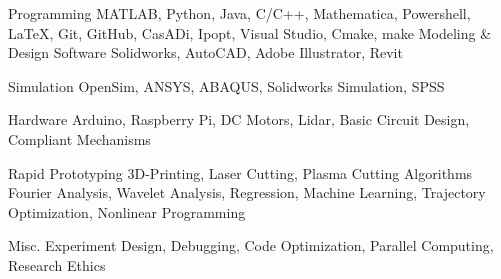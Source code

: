 

\begin{cvskills}

  \cvskill
    {Programming} %
    {MATLAB, Python, Java, C/C++, Mathematica, Powershell, LaTeX, Git, GitHub,} %
  \cvskill
	{ } %
	{CasADi, Ipopt, Visual Studio, Cmake, make} %
  \cvskill
    {Modeling \& Design Software} %
    {Solidworks, AutoCAD, Adobe Illustrator, Revit} %

  \cvskill
    {Simulation} %
    {OpenSim, ANSYS, ABAQUS, Solidworks Simulation, SPSS} %

  \cvskill
    {Hardware} %
    {Arduino, Raspberry Pi, DC Motors, Lidar, Basic Circuit Design, Compliant Mechanisms} %
    
  \cvskill
    {Rapid Prototyping} %
    {3D-Printing, Laser Cutting, Plasma Cutting} %
  \cvskill
	{Algorithms} %
	{Fourier Analysis, Wavelet Analysis, Regression, Machine Learning,} %
  \cvskill
	{} %
	{Trajectory Optimization, Nonlinear Programming} %
	
  \cvskill
	{Misc.} %
	{Experiment Design, Debugging, Code Optimization, Parallel Computing, Research Ethics} %
\end{cvskills}
